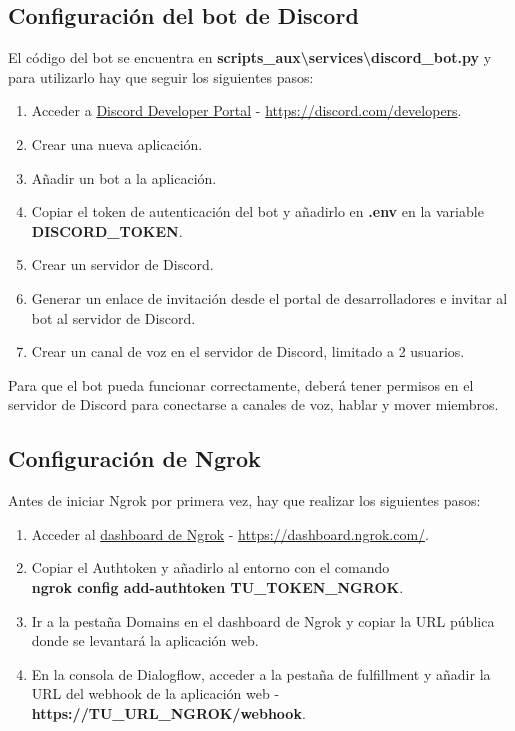     \subsection{Configuración del bot de Discord}

        El código del bot se encuentra en \textbf{scripts\_aux\textbackslash{}services\textbackslash{}discord\_bot.py} y para utilizarlo hay que seguir los siguientes pasos:
        \begin{enumerate}
            \item Acceder a \href{https://discord.com/developers}{Discord Developer Portal} - \url{https://discord.com/developers}.
            \item Crear una nueva aplicación.
            \item Añadir un bot a la aplicación.
            \item Copiar el token de autenticación del bot y añadirlo en \textbf{.env} en la variable \textbf{DISCORD\_TOKEN}.
            \item Crear un servidor de Discord.
            \item Generar un enlace de invitación desde el portal de desarrolladores e invitar al bot al servidor de Discord.
            \item Crear un canal de voz en el servidor de Discord, limitado a 2 usuarios.
        \end{enumerate}
        Para que el bot pueda funcionar correctamente, deberá tener permisos en el servidor de Discord para conectarse a canales de voz, hablar y mover miembros.

    \subsection{Configuración de Ngrok}

        Antes de iniciar Ngrok por primera vez, hay que realizar los siguientes pasos: 
        \begin{enumerate}
            \item Acceder al \href{https://dashboard.ngrok.com/}{dashboard de Ngrok} - \url{https://dashboard.ngrok.com/}.
            \item Copiar el Authtoken y añadirlo al entorno con el comando \\\textbf{ngrok config add-authtoken TU\_TOKEN\_NGROK}.
            \item Ir a la pestaña Domains en el dashboard de Ngrok y copiar la URL pública donde se levantará la aplicación web.
            \item En la consola de Dialogflow, acceder a la pestaña de fulfillment y añadir la URL del webhook de la aplicación web - \textbf{https://TU\_URL\_NGROK/webhook}.
        \end{enumerate}

